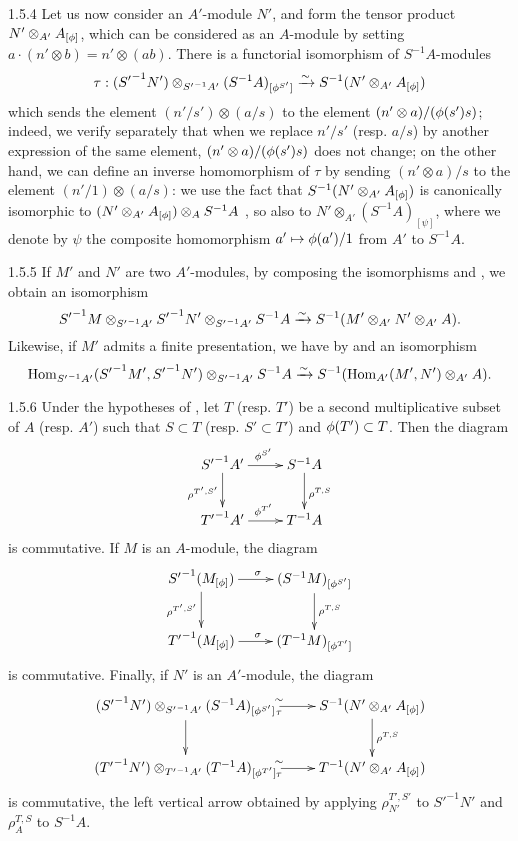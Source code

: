 \begin{env}{1.5.4}
\label{env-0.1.5.4}
Let us now consider an $A'$-module $N'$, and form the tensor product
$N'\otimes_{A'}A_{[\phi]}$, which can be considered as an $A$-module by setting
$a\cdot(n'\otimes b)=n'\otimes(ab)$. There is a functorial isomorphism of
$S^{-1}A$-modules
\[
  \tau:({S'}^{-1}N')\otimes_{{S'}^{-1}A'}(S^{-1}A)_{[\phi^{S'}]}
  \xrightarrow{\sim} S^{-1}(N'\otimes_{A'}A_{[\phi]})
\]
which sends the element $(n'/s')\otimes(a/s)$ to the element
$(n'\otimes a)/(\phi(s')s)$; indeed, we verify separately that when we replace
$n'/s'$ (resp. $a/s$) by another expression of the same element,
$(n'\otimes a)/(\phi(s')s)$ does not change; on the other hand, we can define
an inverse homomorphism of $\tau$ by sending $(n'\otimes a)/s$ to the element
$(n'/1)\otimes(a/s)$: we use the fact that $S^{-1}(N'\otimes_{A'}A_{[\phi]})$
is canonically isomorphic to $(N'\otimes_{A'}A_{[\phi]})\otimes_A S^{-1}A$
, so also to $N'\otimes_{A'}(S^{-1}A)_{[\psi]}$, where we
denote by $\psi$ the composite homomorphism $a'\mapsto\phi(a')/1$ from $A'$ to
$S^{-1}A$.
\end{env}

\begin{env}{1.5.5}
\label{env-0.1.5.5}
If $M'$ and $N'$ are two $A'$-modules, by composing the isomorphisms
 and , we obtain an isomorphism
\[
  {S'}^{-1}M\otimes_{{S'}^{-1}A'}{S'}^{-1}N'\otimes_{{S'}^{-1}A'}S^{-1}A
  \xrightarrow{\sim} S^{-1}(M'\otimes_{A'}N'\otimes_{A'}A).
\]
Likewise, if $M'$ admits a finite presentation, we have by  and
 an isomorphism
\[
  {\mathop{\mathrm{Hom}}\nolimits}_{{S'}^{-1}A'}({S'}^{-1}M',{S'}^{-1}N')\otimes_{{S'}^{-1}A'}S^{-1}A
  \xrightarrow{\sim} S^{-1}({\mathop{\mathrm{Hom}}\nolimits}_{A'}(M',N')\otimes_{A'}A).
\]
\end{env}

\begin{env}{1.5.6}
\label{env-0.1.5.6}
Under the hypotheses of , let $T$ (resp. $T'$) be a second
multiplicative subset of $A$ (resp. $A'$) such that $S\subset T$
(resp. $S'\subset T'$) and $\phi(T')\subset T$. Then the diagram
\[
  \xymatrix{
    {S'}^{-1}A'\ar[r]^{\vphi^{S'}}\ar[d]_{\rho^{T',S'}} &
    S^{-1}A\ar[d]^{\rho^{T,S}}\\
    {T'}^{-1}A'\ar[r]^{\vphi^{T'}} &
    T^{-1}A
  }
\]
is commutative. If $M$ is an $A$-module, the diagram
\[
  \xymatrix{
    {S'}^{-1}(M_{[\vphi]})\ar[r]^\sigma\ar[d]_{\rho^{T',S'}} &
    (S^{-1}M)_{[\vphi^{S'}]}\ar[d]^{\rho^{T,S}}\\
    {T'}^{-1}(M_{[\vphi]})\ar[r]^\sigma &
    (T^{-1}M)_{[\vphi^{T'}]}
  }
\]
is commutative. Finally, if $N'$ is an $A'$-module, the diagram
\[
  \xymatrix{
    ({S'}^{-1}N')\otimes_{{S'}^{-1}A'}(S^{-1}A)_{[\vphi^{S'}]}
      \ar[r]^\sim_\tau\ar[d] &
    S^{-1}(N'\otimes_{A'}A_{[\vphi]})\ar[d]^{\rho^{T,S}}\\
    ({T'}^{-1}N')\otimes_{{T'}^{-1}A'}(T^{-1}A)_{[\vphi^{T'}]}
      \ar[r]^\sim_\tau &
    T^{-1}(N'\otimes_{A'}A_{[\vphi]})
  }
\]
is commutative, the left vertical arrow obtained by applying
$\rho_{N'}^{T',S'}$ to ${S'}^{-1}N'$ and $\rho_A^{T,S}$ to $S^{-1}A$.
\end{env}

